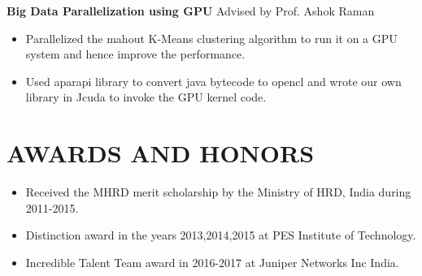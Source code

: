 \documentclass[margin]{res}
\begin{document}
\begin{resume}
\textbf{Big Data Parallelization using GPU}  \hfill Advised by Prof. Ashok Raman
\begin{itemize} 
\item Parallelized the mahout K-Means clustering algorithm to run it on a GPU system and hence improve the performance.
\item Used aparapi library to convert java bytecode to opencl and wrote our own library in Jcuda to invoke the GPU kernel code.
\end{itemize}


\section{AWARDS AND HONORS}
\begin{itemize}
\item Received the MHRD merit scholarship by the Ministry of HRD, India during 2011-2015.
\item Distinction award in the years 2013,2014,2015 at PES Institute of Technology. 
\item Incredible Talent Team award in 2016-2017 at Juniper Networks Inc India.
\end{itemize}


\end{resume}
\end{document}

